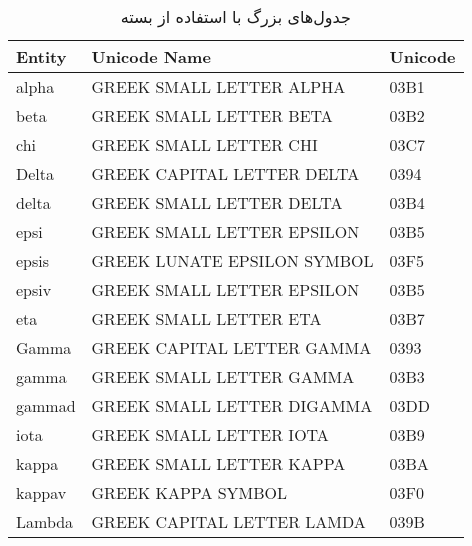 \begin{longtable}{lll}
\caption{جدول‌های بزرگ با استفاده از بسته }\\
   \bfseries Entity&\bfseries  Unicode Name&\bfseries  Unicode\\ \hline
\endfirsthead
\endlastfoot
alpha              & GREEK SMALL LETTER ALPHA            & 03B1\\
beta               & GREEK SMALL LETTER BETA             & 03B2\\
chi                & GREEK SMALL LETTER CHI              & 03C7\\
\pagebreak
Delta              & GREEK CAPITAL LETTER DELTA          & 0394\\
delta              & GREEK SMALL LETTER DELTA            & 03B4\\
epsi               & GREEK SMALL LETTER EPSILON          & 03B5\\
epsis              & GREEK LUNATE EPSILON SYMBOL         & 03F5\\
epsiv              & GREEK SMALL LETTER EPSILON          & 03B5\\
eta                & GREEK SMALL LETTER ETA              & 03B7\\
Gamma              & GREEK CAPITAL LETTER GAMMA          & 0393\\
gamma              & GREEK SMALL LETTER GAMMA            & 03B3\\
gammad             & GREEK SMALL LETTER DIGAMMA          & 03DD\\
iota               & GREEK SMALL LETTER IOTA             & 03B9\\
kappa              & GREEK SMALL LETTER KAPPA            & 03BA\\
kappav             & GREEK KAPPA SYMBOL                  & 03F0\\
Lambda             & GREEK CAPITAL LETTER LAMDA          & 039B\\

\end{longtable}
